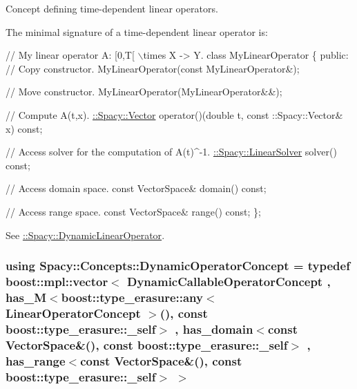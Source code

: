 Concept defining time-\/dependent linear operators. 

\label{group__ConceptGroup_ga015b0d099011a2ef73a16aa9b36a7346_DynamicLinearOperatorConceptAnchor}%
\hypertarget{group__ConceptGroup_ga015b0d099011a2ef73a16aa9b36a7346_DynamicLinearOperatorConceptAnchor}{}%
The minimal signature of a time-\/dependent linear operator is\+: 
\begin{DoxyCode}
\textcolor{comment}{// My linear operator A: [0,T[ \(\backslash\)times X -> Y.}
\textcolor{keyword}{class }MyLinearOperator
\{
\textcolor{keyword}{public}:
  \textcolor{comment}{// Copy constructor.}
  MyLinearOperator(\textcolor{keyword}{const} MyLinearOperator&);

  \textcolor{comment}{// Move constructor.}
  MyLinearOperator(MyLinearOperator&&);

  \textcolor{comment}{// Compute A(t,x).}
  \hyperlink{classSpacy_1_1Vector}{::Spacy::Vector} operator()(\textcolor{keywordtype}{double} t, const ::Spacy::Vector& x) \textcolor{keyword}{const};

  \textcolor{comment}{// Access solver for the computation of A(t)^-1.}
  \hyperlink{namespaceSpacy_a7d5cd1c6fb9dd85aa345b536caf30bba_a7d5cd1c6fb9dd85aa345b536caf30bba}{::Spacy::LinearSolver} solver() \textcolor{keyword}{const};

  \textcolor{comment}{// Access domain space.}
  \textcolor{keyword}{const} VectorSpace& domain() \textcolor{keyword}{const};

  \textcolor{comment}{// Access range space.}
  \textcolor{keyword}{const} VectorSpace& range() \textcolor{keyword}{const};
\};
\end{DoxyCode}


See \hyperlink{group__SpacyGroup_gaad10aa7d5443703377b768fa41a3c7ea_DynamicLinearOperatorAnchor}{\+:\+:Spacy\+:\+:Dynamic\+Linear\+Operator}. \hypertarget{group__ConceptGroup_ga2c979d268f0ca7a436776a9631d10af7_ga2c979d268f0ca7a436776a9631d10af7}{}
\subsubsection[{Dynamic\+Operator\+Concept}]{\setlength{\rightskip}{0pt plus 5cm}using {\bf Spacy\+::\+Concepts\+::\+Dynamic\+Operator\+Concept} = typedef boost\+::mpl\+::vector$<$ Dynamic\+Callable\+Operator\+Concept , has\+\_\+\+M$<$boost\+::type\+\_\+erasure\+::any$<$ Linear\+Operator\+Concept $>$(), const boost\+::type\+\_\+erasure\+::\+\_\+self$>$ , has\+\_\+domain$<$const Vector\+Space\&(), const boost\+::type\+\_\+erasure\+::\+\_\+self$>$ , has\+\_\+range$<$const Vector\+Space\&(), const boost\+::type\+\_\+erasure\+::\+\_\+self$>$ $>$}\label{group__ConceptGroup_ga2c979d268f0ca7a436776a9631d10af7_ga2c979d268f0ca7a436776a9631d10af7}


